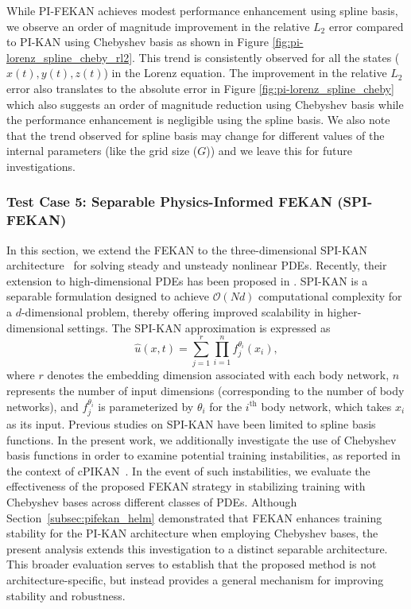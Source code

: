 \documentclass{article}
\begin{document}
While PI-FEKAN achieves modest performance enhancement using spline basis, we observe an order of magnitude improvement in the relative $L_2$ error compared to PI-KAN using Chebyshev basis as shown in Figure \ref{fig:pi-lorenz_spline_cheby_rl2}. This trend is consistently observed for all the states ($x(t), y(t), z(t)$) in the Lorenz equation. The improvement in the relative $L_2$ error also translates to the absolute error in Figure \ref{fig:pi-lorenz_spline_cheby} which also suggests an order of magnitude reduction using Chebyshev basis while the performance enhancement is negligible using the spline basis. We also note that the trend observed for spline basis may change for different values of the internal parameters (like the grid size ($G$)) and we leave this for future investigations.

\subsubsection{Test Case 5: Separable Physics-Informed FEKAN (SPI-FEKAN)} 
\label{subsec:spifekan_kg_helm}
In this section, we extend the FEKAN to the three-dimensional SPI-KAN architecture~\cite{jacob2025spikans} for solving steady and unsteady nonlinear PDEs. Recently, their extension to high-dimensional PDEs has been proposed in \cite{menon2025anant}. SPI-KAN is a separable formulation designed to achieve $\mathcal{O}(Nd)$ computational complexity for a $d$-dimensional problem, thereby offering improved scalability in higher-dimensional settings.
The SPI-KAN approximation is expressed as
\begin{equation}
    \hat{u}(x,t) = \sum_{j=1}^{r} \prod_{i=1}^{n} f_{j}^{\theta_i}(x_i),
\end{equation}
\noindent
where $r$ denotes the embedding dimension associated with each body network, $n$ represents the number of input dimensions (corresponding to the number of body networks), and $f_{j}^{\theta_i}$ is parameterized by $\theta_i$ for the $i^{\text{th}}$ body network, which takes $x_i$ as its input. 
Previous studies on SPI-KAN have been limited to spline basis functions. In the present work, we additionally investigate the use of Chebyshev basis functions in order to examine potential training instabilities, as reported in the context of cPIKAN~\cite{shukla2024comprehensive}. In the event of such instabilities, we evaluate the effectiveness of the proposed FEKAN strategy in stabilizing training with Chebyshev bases across different classes of PDEs.
Although Section~\ref{subsec:pifekan_helm} demonstrated that FEKAN enhances training stability for the PI-KAN architecture when employing Chebyshev bases, the present analysis extends this investigation to a distinct separable architecture. This broader evaluation serves to establish that the proposed method is not architecture-specific, but instead provides a general mechanism for improving stability and robustness.
\end{document}
